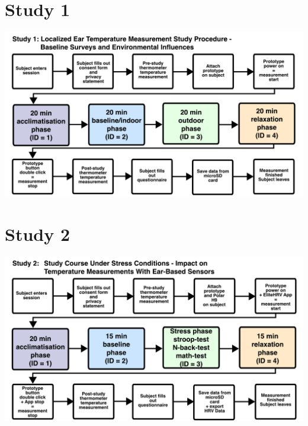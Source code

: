 \documentclass[en]{sdqbeamer}
\begin{document}
\section{Study 1}
\begin{frame}%
    \includegraphics[width=0.95\linewidth]{../thesis-doc/images/study1/Procedure.pdf} %
\end{frame}

\section{Study 2}
\begin{frame}%
    \includegraphics[width=0.95\linewidth]{../thesis-doc/images/study2/Procedure2.pdf} %
\end{frame}
\end{document}
